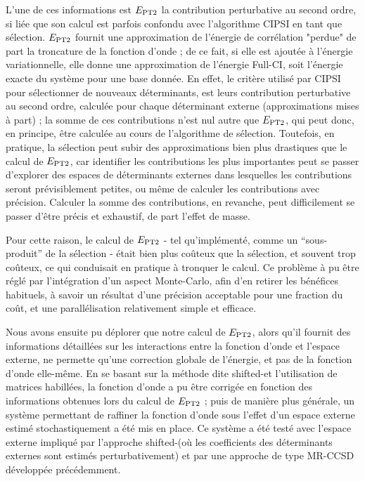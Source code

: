 \documentclass[./thesis.tex]{subfiles}
\begin{document}
L'une de ces informations est $E_\text{PT2}$ la contribution perturbative au second ordre, si liée que son calcul est parfois confondu avec l'algorithme CIPSI en tant que sélection. $E_\text{PT2}$ fournit une approximation de l'énergie de corrélation "perdue" de part la troncature de la fonction d'onde ; de ce fait, si elle est ajoutée à l'énergie variationnelle, elle donne une approximation de l'énergie Full-CI, soit l'énergie exacte du système pour une base donnée. En effet, le critère utilisé par CIPSI pour sélectionner de nouveaux déterminants, est leurs contribution perturbative au second ordre, calculée pour chaque déterminant externe (approximations mises à part) ; la somme de ces contributions n'est nul autre que $E_\text{PT2}$, qui peut donc, en principe, être calculée au cours de l'algorithme de sélection. Toutefois, en pratique, la sélection peut subir des approximations bien plus drastiques que le calcul de $E_\text{PT2}$, car identifier les contributions les plus importantes peut se passer d'explorer des espaces de déterminants externes dans lesquelles les contributions seront prévisiblement petites, ou même de calculer les contributions avec précision. Calculer la somme des contributions, en revanche, peut difficilement se passer d'être précis et exhaustif, de part l'effet de masse.

Pour cette raison, le calcul de $E_\text{PT2}$ - tel qu'implémenté, comme un ``sous-produit'' de la sélection - était bien plus coûteux que la sélection, et souvent trop coûteux, ce qui conduisait en pratique à tronquer le calcul. Ce problème à pu être réglé par l'intégration d'un aspect Monte-Carlo, afin d'en retirer les bénéfices habituels, à savoir un résultat d'une précision acceptable pour une fraction du coût, et une parallélisation relativement simple et efficace.

Nous avons ensuite pu déplorer que notre calcul de $E_\text{PT2}$, alors qu'il fournit des informations détaillées sur les interactions entre la fonction d'onde et l'espace externe, ne permette qu'une correction globale de l'énergie, et pas de la fonction d'onde elle-même. En se basant sur la méthode dite shifted-\Bk et l'utilisation de matrices habillées,\cite{Nitzsche_1978a, Nitzsche_1978b, Rawlings_1983, Kozlowski_1995, Kozlowski_1994a, Kozlowski_1994b, Kozlowski_1994c} la fonction d'onde a pu être corrigée en fonction des informations obtenues lors du calcul de $E_\text{PT2}$ ; puis de manière plus générale, un système permettant de raffiner la fonction d'onde sous l'effet d'un espace externe estimé stochastiquement a été mis en place. Ce système a été testé avec l'espace externe impliqué par l'approche shifted-\Bk (où les coefficients des déterminants externes sont estimés perturbativement) et par une approche de type MR-CCSD développée précédemment.
\end{document}
